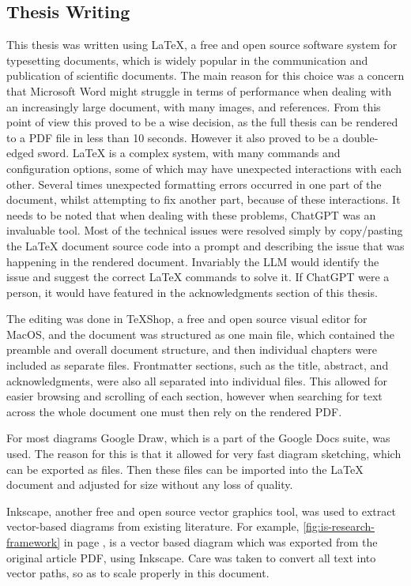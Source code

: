 

\subsection{Thesis Writing}

This thesis was written using LaTeX, a free and open source software system for typesetting documents, which is widely popular in the communication and publication of scientific documents. The main reason for this choice was a concern that Microsoft Word might struggle in terms of performance when dealing with an increasingly large document, with many images, and references. From this point of view this proved to be a wise decision, as the full thesis can be rendered to a PDF file in less than 10 seconds. However it also proved to be a double-edged sword. LaTeX is a complex system, with many commands and configuration options, some of which may have unexpected interactions with each other. Several times unexpected formatting errors occurred in one part of the document, whilst attempting to fix another part, because of these interactions.
It needs to be noted that when dealing with these problems, ChatGPT was an invaluable tool. Most of the technical issues were resolved simply by copy/pasting the LaTeX document source code into a prompt and describing the issue that was happening in the rendered document. Invariably the LLM would identify the issue and suggest the correct LaTeX commands to solve it. If ChatGPT were a person, it would have featured in the acknowledgments section of this thesis.

The editing was done in TeXShop, a free and open source visual editor for MacOS, and the document was structured as one main file, which contained the preamble and overall document structure, and then individual chapters were included as separate files. Frontmatter sections, such as the title, abstract, and acknowledgments, were also all separated into individual files. This allowed for easier browsing and scrolling of each section, however when searching for text across the whole document one must then rely on the rendered PDF.



For most diagrams Google Draw, which is a part of the Google Docs suite, was used. The reason for this is that it allowed for very fast diagram sketching, which can be exported as  files. Then these files can be imported into the LaTeX document and adjusted for size without any loss of quality.

Inkscape, another free and open source vector graphics tool, was used to extract vector-based diagrams from existing literature. For example, \autoref{fig:is-research-framework} in page \pageref{fig:is-research-framework}, is a vector based diagram which was exported from the original article PDF, using Inkscape. Care was taken to convert all text into vector paths, so as to scale properly in this document.


